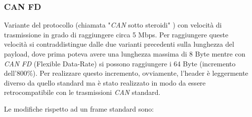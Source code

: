 \subsubsection{CAN FD}
Variante del protocollo (chiamata "\emph{CAN} sotto steroidi" \cite{can_bus_dewesoft}) con velocità di trasmissione in grado di raggiungere circa 5 Mbps. Per raggiungere queste velocità si contraddistingue dalle due varianti precedenti sulla lunghezza del payload, dove prima poteva avere una lunghezza massima di 8 Byte mentre con \emph{CAN FD} (Flexible Data-Rate) si possono raggiungere i 64 Byte (incremento dell'800\%). Per realizzare questo incremento, ovviamente, l'header è leggermente diverso da quello standard ma è stato realizzato in modo da essere retrocompatibile con le trasmissioni \emph{CAN} standard.

Le modifiche rispetto ad un frame standard sono:
